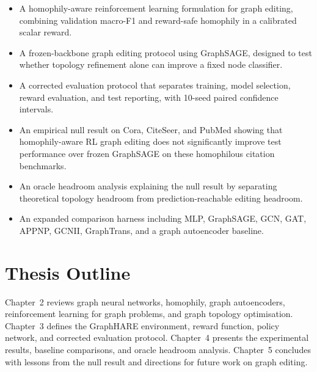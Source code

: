 \begin{itemize}
    \item A homophily-aware reinforcement learning formulation for graph editing, combining
    validation macro-F1 and reward-safe homophily in a calibrated scalar reward.

    \item A frozen-backbone graph editing protocol using GraphSAGE, designed to test whether
    topology refinement alone can improve a fixed node classifier.

    \item A corrected evaluation protocol that separates training, model selection, reward
    evaluation, and test reporting, with 10-seed paired confidence intervals.

    \item An empirical null result on Cora, CiteSeer, and PubMed showing that homophily-aware
    RL graph editing does not significantly improve test performance over frozen GraphSAGE
    on these homophilous citation benchmarks.

    \item An oracle headroom analysis explaining the null result by separating theoretical
    topology headroom from prediction-reachable editing headroom.

    \item An expanded comparison harness including MLP, GraphSAGE, GCN, GAT, APPNP, GCNII,
    GraphTrans, and a graph autoencoder baseline.
\end{itemize}

\section*{Thesis Outline}

Chapter~2 reviews graph neural networks, homophily, graph autoencoders, reinforcement
learning for graph problems, and graph topology optimisation. Chapter~3 defines the
GraphHARE environment, reward function, policy network, and corrected evaluation protocol.
Chapter~4 presents the experimental results, baseline comparisons, and oracle headroom
analysis. Chapter~5 concludes with lessons from the null result and directions for future
work on graph editing.
